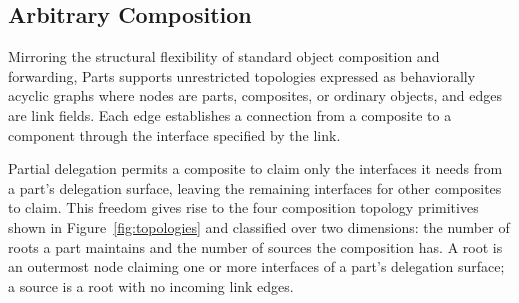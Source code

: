 \documentclass[acmsmall,screen,review,anonymous]{acmart}
\theoremstyle{acmplain}
\begin{document}
\subsection{Arbitrary Composition}
\label{subsec:topologies}

Mirroring the structural flexibility of standard object composition and forwarding, Parts supports unrestricted topologies
expressed as behaviorally acyclic graphs where nodes are parts, composites, or ordinary objects, and edges are
link fields. Each edge establishes a connection from a composite to a component through the interface specified by the link.

Partial delegation permits a composite to claim only the interfaces it needs from a part's delegation surface, leaving the
remaining interfaces for other composites to claim. This freedom gives rise to the four composition topology primitives
shown in Figure~\ref{fig:topologies} and classified over two dimensions: the number of roots a part maintains and the number
of sources the composition has. A root is an outermost node claiming one or more interfaces of a part's delegation surface;
a source is a root with no incoming link edges.
\end{document}
